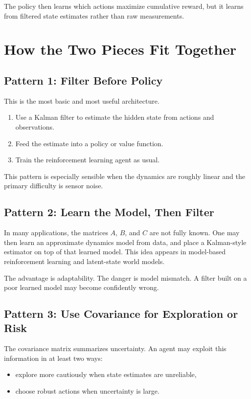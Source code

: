 \documentclass[12pt,a4paper]{article}
\begin{document}
The policy then learns which actions maximize cumulative reward, but it learns from filtered state estimates rather than raw measurements.

\section{How the Two Pieces Fit Together}

\subsection{Pattern 1: Filter Before Policy}

This is the most basic and most useful architecture.

\begin{enumerate}
  \item Use a Kalman filter to estimate the hidden state from actions and observations.
  \item Feed the estimate into a policy or value function.
  \item Train the reinforcement learning agent as usual.
\end{enumerate}

This pattern is especially sensible when the dynamics are roughly linear and the primary difficulty is sensor noise.

\subsection{Pattern 2: Learn the Model, Then Filter}

In many applications, the matrices \(A\), \(B\), and \(C\) are not fully known. One may then learn an approximate dynamics model from data, and place a Kalman-style estimator on top of that learned model. This idea appears in model-based reinforcement learning and latent-state world models.

The advantage is adaptability. The danger is model mismatch. A filter built on a poor learned model may become confidently wrong.

\subsection{Pattern 3: Use Covariance for Exploration or Risk}

The covariance matrix summarizes uncertainty. An agent may exploit this information in at least two ways:
\begin{itemize}
  \item explore more cautiously when state estimates are unreliable,
  \item choose robust actions when uncertainty is large.
\end{itemize}
\end{document}
